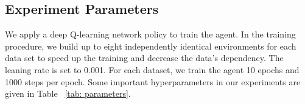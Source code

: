 \subsection{Experiment Parameters}
We apply a deep Q-learning network policy to train the agent. In the training procedure, we build up to eight independently identical environments for each data set to speed up the training and decrease the data's dependency. The leaning rate is set to 0.001. For each dataset, we train the agent 10 epochs and 1000 steps per epoch. Some important hyperparameters in our experiments are given in Table ~\ref{tab: parameters}.

\begin{table}[!t]
	\centering
	\label{tab: parameters}
	\caption{Experiment parameter}
	\label{tab: parameters}
\end{table}

